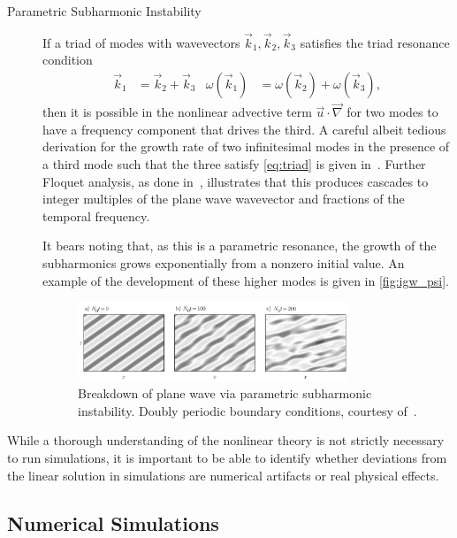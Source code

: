 \documentclass[11pt,
        usenames, %
        dvipsnames %
    ]{article}
\begin{document}
\begin{description}
    \item[Parametric Subharmonic Instability] If a triad of modes with
        wavevectors $\vec{k}_1, \vec{k}_2, \vec{k}_3$ satisfies the triad
        resonance condition
        \begin{align}
            \vec{k}_1 &= \vec{k}_2 + \vec{k}_3 &
            \omega(\vec{k}_1) &= \omega(\vec{k}_2) + \omega(\vec{k}_3),
            \label{eq:triad}
        \end{align}
        then it is possible in the nonlinear advective term $\vec{u} \cdot
        \vec{\nabla}$ for two modes to have a frequency component that drives
        the third. A careful albeit tedious derivation for the growth rate of
        two infinitesimal modes in the presence of a third mode such that the
        three satisfy \autoref{eq:triad} is given in~\cite{psi}. Further Floquet
        analysis, as done in~\cite{DrazinFloquet}, illustrates that this
        produces cascades to integer multiples of the plane wave wavevector and
        fractions of the temporal frequency.

        It bears noting that, as this is a parametric resonance, the growth of
        the subharmonics grows exponentially from a nonzero initial value. An
        example of the development of these higher modes is given in
        \autoref{fig:igw_psi}.
        \begin{figure}[t]
            \centering
            \includegraphics[width=0.8\textwidth]{figs/igw_psi.png}
            \caption{Breakdown of plane wave via parametric subharmonic
            instability. Doubly periodic boundary conditions, courtesy
            of~\cite{SutherlandBook}.}\label{fig:igw_psi}
        \end{figure}
\end{description}

While a thorough understanding of the nonlinear theory is not strictly
necessary to run simulations, it is important to be able to identify whether
deviations from the linear solution in simulations are numerical artifacts or
real physical effects.

\subsection{Numerical Simulations}
\end{document}
